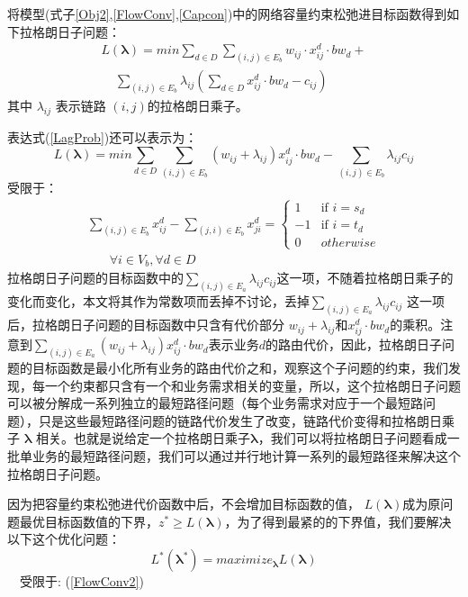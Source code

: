 将模型(式子\ref{Obj2},\ref{FlowConv},\ref{Capcon})中的网络容量约束松弛进目标函数得到如下拉格朗日子问题：
\begin{equation}\label{LagProb}
\begin{split}
L(\mathbf{\lambda})= min\sum\limits_{d \in D}\sum\limits_{(i,j) \in E_b} w_{ij}\cdot x_{ij}^d\cdot bw_d+ \\ ~~~~~\sum\limits_{(i,j) \in E_b}\lambda_{ij}(\sum\limits_{d \in D} x_{ij}^d \cdot bw_d-c_{ij})
\end{split}
\end{equation}
其中 $\lambda_{ij}$ 表示链路 $(i,j)$的拉格朗日乘子。

表达式(\ref{LagProb})还可以表示为：
\begin{equation}\label{Lagprob1}
L(\mathbf{\lambda})= min\sum\limits_{d \in D}\sum\limits_{(i,j) \in E_b} (w_{ij}+\lambda_{ij})x_{ij}^d \cdot bw_d -\sum\limits_{(i,j) \in E_b}\lambda_{ij}c_{ij}
\end{equation}
受限于：
\begin{equation}\label{FlowConv2}
\begin{split}
\sum\limits_{(i,j) \in E_b} x_{ij}^d - \sum\limits_{(j,i) \in E_b} x_{ji}^d
=\begin{cases}
1 & \text{if $i = s_d$}\\
-1 & \text{if $i = t_d$} \\
0 &{otherwise}
\end{cases}
\\~~~~~~~~\forall i\in V_b, \forall d\in D
\end{split}
\end{equation}
拉格朗日子问题的目标函数中的$\sum_{(i,j) \in E_a}\lambda_{ij}c_{ij}$这一项，不随着拉格朗日乘子的变化而变化，本文将其作为常数项而丢掉不讨论，丢掉$\sum_{(i,j) \in E_a}\lambda_{ij}c_{ij}$ 这一项后，拉格朗日子问题的目标函数中只含有代价部分 $w_{ij}+\lambda_{ij}$和$x_{ij}^d\cdot bw_d$的乘积。注意到$\sum_{(i,j) \in E_a} (w_{ij}+\lambda_{ij})x_{ij}^d\cdot bw_d$表示业务$d$的路由代价，因此，拉格朗日子问题的目标函数是最小化所有业务的路由代价之和，观察这个子问题的约束，我们发现，每一个约束都只含有一个和业务需求相关的变量，所以，这个拉格朗日子问题可以被分解成一系列独立的最短路径问题（每个业务需求对应于一个最短路问题），只是这些最短路径问题的链路代价发生了改变，链路代价变得和拉格朗日乘子 $\mathbf{\lambda}$ 相关。也就是说给定一个拉格朗日乘子$\mathbf{\lambda}$，我们可以将拉格朗日子问题看成一批单业务的最短路径问题，我们可以通过并行地计算一系列的最短路径来解决这个拉格朗日子问题。

因为把容量约束松弛进代价函数中后，不会增加目标函数的值， $L(\mathbf{\lambda})$成为原问题最优目标函数值的下界，$z^* \ge L(\mathbf{\lambda})$，为了得到最紧的的下界值，我们要解决以下这个优化问题：
\begin{equation}\label{dual}
L^*(\mathbf{\lambda^*}) = maximize_{\mathbf{\lambda}}L(\mathbf{\lambda})
\end{equation}
~~受限于: (\ref{FlowConv2})
\vskip 0.2cm

